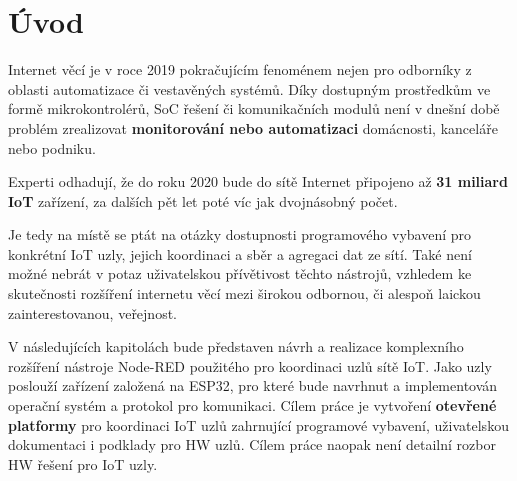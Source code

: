 \chapter{Úvod}
\label{ch:uvod}

Internet věcí je v roce 2019 pokračujícím fenoménem nejen pro odborníky z oblasti automatizace či vestavěných systémů. Díky dostupným prostředkům ve formě mikrokontrolérů, SoC řešení či komunikačních modulů není v dnešní době problém zrealizovat \textbf{monitorování nebo automatizaci} domácnosti, kanceláře nebo podniku.

Experti odhadují, že do roku 2020 bude do sítě Internet připojeno až \textbf{31 miliard IoT} zařízení, za dalších pět let poté víc jak dvojnásobný počet. 

Je tedy na místě se ptát na otázky dostupnosti programového vybavení pro konkrétní IoT uzly, jejich koordinaci a sběr a agregaci dat ze sítí. Také není možné nebrát v potaz uživatelskou přívětivost těchto nástrojů, vzhledem ke skutečnosti rozšíření internetu věcí mezi širokou odbornou, či alespoň laickou zainterestovanou, veřejnost.

V následujících kapitolách bude představen návrh a realizace komplexního rozšíření nástroje Node-RED použitého pro koordinaci uzlů sítě IoT. Jako uzly poslouží zařízení založená na ESP32, pro které bude navrhnut a implementován operační systém a protokol pro komunikaci. Cílem práce je vytvoření \textbf{otevřené platformy} pro koordinaci IoT uzlů zahrnující programové vybavení, uživatelskou dokumentaci i podklady pro HW uzlů. Cílem práce naopak není detailní rozbor HW řešení pro IoT uzly.   


\cite{ESP32Datasheet}